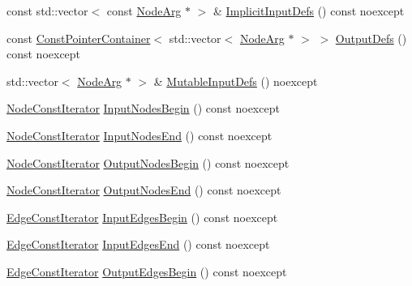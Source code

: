 \begin{DoxyCompactItemize}
const std\+::vector$<$ const \mbox{\hyperlink{classonnxruntime_1_1NodeArg}{Node\+Arg}} $\ast$ $>$ \& \mbox{\hyperlink{classonnxruntime_1_1Node_abc00c5bc378c029ab07000675cda877d}{Implicit\+Input\+Defs}} () const noexcept
\item 
const \mbox{\hyperlink{classonnxruntime_1_1ConstPointerContainer}{Const\+Pointer\+Container}}$<$ std\+::vector$<$ \mbox{\hyperlink{classonnxruntime_1_1NodeArg}{Node\+Arg}} $\ast$ $>$ $>$ \mbox{\hyperlink{classonnxruntime_1_1Node_ab24f8d81f72e751a66a125b6af5d97f7}{Output\+Defs}} () const noexcept
\item 
std\+::vector$<$ \mbox{\hyperlink{classonnxruntime_1_1NodeArg}{Node\+Arg}} $\ast$ $>$ \& \mbox{\hyperlink{classonnxruntime_1_1Node_a93bf7c4122525a6d6c221f059b0d4eea}{Mutable\+Input\+Defs}} () noexcept
\item 
\mbox{\hyperlink{classonnxruntime_1_1Node_1_1NodeConstIterator}{Node\+Const\+Iterator}} \mbox{\hyperlink{classonnxruntime_1_1Node_aba20d41c500d0548e7559006eb43fca0}{Input\+Nodes\+Begin}} () const noexcept
\item 
\mbox{\hyperlink{classonnxruntime_1_1Node_1_1NodeConstIterator}{Node\+Const\+Iterator}} \mbox{\hyperlink{classonnxruntime_1_1Node_a947a3c8e5737bfada9fc1749cbb968c7}{Input\+Nodes\+End}} () const noexcept
\item 
\mbox{\hyperlink{classonnxruntime_1_1Node_1_1NodeConstIterator}{Node\+Const\+Iterator}} \mbox{\hyperlink{classonnxruntime_1_1Node_aac357428a320fca4f9d52e05e2dd44fe}{Output\+Nodes\+Begin}} () const noexcept
\item 
\mbox{\hyperlink{classonnxruntime_1_1Node_1_1NodeConstIterator}{Node\+Const\+Iterator}} \mbox{\hyperlink{classonnxruntime_1_1Node_a60e3a6caa17f877df67ab51f9aa973d8}{Output\+Nodes\+End}} () const noexcept
\item 
\mbox{\hyperlink{classonnxruntime_1_1Node_ae0df52e26b0237505b6a0cbc25106d9d}{Edge\+Const\+Iterator}} \mbox{\hyperlink{classonnxruntime_1_1Node_ab7e6afa5d6224178d1b43465b63cccb2}{Input\+Edges\+Begin}} () const noexcept
\item 
\mbox{\hyperlink{classonnxruntime_1_1Node_ae0df52e26b0237505b6a0cbc25106d9d}{Edge\+Const\+Iterator}} \mbox{\hyperlink{classonnxruntime_1_1Node_a0093d2a46230063ae22d83278e3da9bf}{Input\+Edges\+End}} () const noexcept
\item 
\mbox{\hyperlink{classonnxruntime_1_1Node_ae0df52e26b0237505b6a0cbc25106d9d}{Edge\+Const\+Iterator}} \mbox{\hyperlink{classonnxruntime_1_1Node_a45938369e281e8ad422fb22a0f19d5f1}{Output\+Edges\+Begin}} () const noexcept

\end{DoxyCompactItemize}
